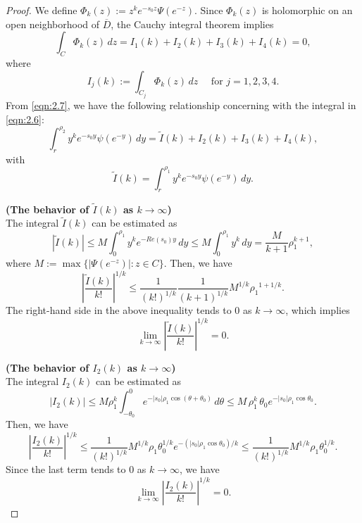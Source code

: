 \documentclass[12pt]{amsart}
\numberwithin{equation}{section}
\theoremstyle{definition}
\theoremstyle{remark}
\newcommand{\1}{{\bf 1}}
\begin{document}
\begin{proof}


We define $\Phi_k(z):=z^k e^{-s_0z}\Psi(e^{-z})$.
Since $\Phi_k(z)$ is holomorphic on an open 
neighborhood of $\overline{D}$,
the Cauchy integral theorem implies
\begin{equation}\label{eqn:2.7}
\int_C \Phi_k(z)\,dz
=I_1(k)+I_2(k)+I_3(k)+I_4(k) %
=0,
\end{equation}
where 
$$
I_j(k):=\int_{C_j}\Phi_k(z)\,dz \quad 
\text{ for } j=1,2,3,4.
$$ 
From \eqref{eqn:2.7},
we have the following relationship concerning with 
the integral in \eqref{eqn:2.6}:
\begin{equation}\label{eqn:2.8}
\int_r^{\rho_2} 
y^k e^{-s_0y}\psi(e^{-y})\,dy
=\tilde{I}(k)+I_2(k)+I_3(k)+I_4(k),
\end{equation}
with
\begin{equation*}
\tilde{I}(k)=
\int_r^{\rho_1} y^k e^{-s_0y}\psi(e^{-y})\,dy.
\end{equation*}

{\bf (The behavior of $\tilde{I}(k)$ as $k\to\infty$)} \\
The integral $\tilde{I}(k)$ can be estimated as
\begin{equation*}
\left|\tilde{I}(k)\right|
\le M\int_0^{\rho_1} y^k e^{-{Re}(s_0)y}\,dy 
\le M\int_0^{\rho_1} y^k\,dy
=\frac{M}{k+1}\rho_1^{k+1},
\end{equation*}
where $M:=\max\{|\Psi(e^{-z})|:z\in C\}$.
Then,
we have
\begin{equation*}\label{eqn:2.}
\left|\frac{\tilde{I}(k)}{k!} \right|^{1/k} 
\le \frac{1}{(k!)^{1/k}}\frac{1}{(k+1)^{1/k}} 
M^{1/k}  {\rho_1}^{1+1/k}.
\end{equation*}
The right-hand side in the above 
inequality  tends to $0$ as $k \to \infty$,
which implies
\begin{equation}\label{eqn:2.9}
\lim_{k\to \infty}\left|\frac{\tilde{I}(k)}{k!}\right|^{1/k}
=0.
\end{equation}

{\bf (The behavior of $I_2(k)$ as $k\to\infty$)} \\
The integral $I_2(k)$ can be estimated as
\begin{equation*}
|I_2(k)|
\le M \rho_1^k
\int_{-\theta_0}^0 
e^{-|s_0|\rho_1 \cos(\theta+\theta_0)}\,d\theta
\le M \, \rho_1^k \, 
\theta_0 e^{-|s_0|\rho_1 \cos\theta_0}.
\end{equation*}
Then,
we have
\begin{equation*}
\left|\frac{I_2(k)}{k!} \right|^{1/k} 
\le \frac{1}{(k!)^{1/k}} M^{1/k} \rho_1 
\theta_0^{1/k} e^{-(|s_0|\rho_1 \cos\theta_0)/k}
\le \frac{1}{(k!)^{1/k}} M^{1/k}\rho_1 \theta_0^{1/k}.
\end{equation*}
Since the last term tends to $0$ as $k \to \infty$,
we have
\begin{equation}\label{eqn:2.10}
\lim_{k\to\infty}\left|\frac{I_2(k)}{k!}\right|^{1/k}=0.
\end{equation}


\end{proof}
\end{document}
